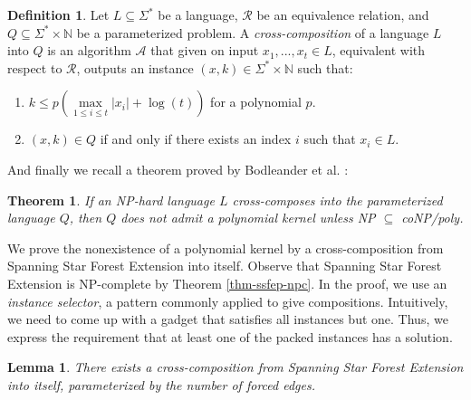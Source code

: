 \documentclass[en]{pracamgr}
\newtheorem{theorem}{Theorem}
\newtheorem{lemma}{Lemma}
\theoremstyle{definition}
\newtheorem{definition}{Definition}
\newcommand{\ssfep}{{\sc Spanning Star Forest Extension}}
\begin{document}
\begin{definition}\label{cross-composition}
	Let $L \subseteq \Sigma^*$ be a language, $\mathcal{R}$ be an equivalence relation, and $Q \subseteq \Sigma^* \times \mathbb{N}$ be a parameterized problem. A \textit{cross-composition} of a language $L$ into $Q$ is an algorithm $\mathcal{A}$ that given on input $x_1,...,x_t \in L$, equivalent with respect to $\mathcal{R}$, outputs an instance $(x,k) \in \Sigma^* \times \mathbb{N}$ such that:
	\begin{enumerate}
		\item $k \leq p(\max\limits_{1 \leq i \leq t} |x_i| + \log(t))$ for a polynomial $p$.
		\item $(x,k) \in Q$ if and only if there exists an index $i$ such that $x_i \in L$.
	\end{enumerate}
\end{definition}

And finally we recall a theorem proved by Bodleander et al. \cite{CROSS}:

\begin{theorem}\label{nokernel}
	If an NP-hard language $L$ cross-composes into the parameterized language $Q$, then $Q$ does not admit a polynomial kernel unless \textit{NP $\subseteq$ coNP/poly}.
\end{theorem}

We prove the nonexistence of a polynomial kernel by a cross-composition from \ssfep{} into itself. Observe that \ssfep{} is NP-complete by Theorem \ref{thm-ssfep-npc}. In the proof, we use an \emph{instance selector}, a pattern commonly applied to give compositions. Intuitively, we need to come up with a gadget that satisfies all instances but one. Thus, we express the requirement that at least one of the packed instances has a solution.

\begin{lemma}\label{cross-ssfe}
	There exists a cross-composition from \ssfep{} into itself, parameterized by the number of forced edges.
\end{lemma}
\end{document}
